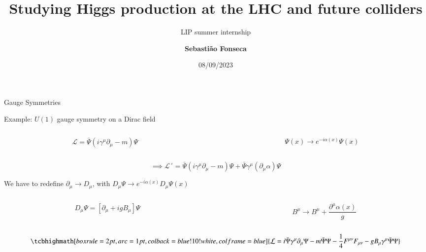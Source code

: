 \documentclass[10pt,t]{beamer}
\title{Studying Higgs production at the LHC and future colliders}
\subtitle{\small LIP summer internship}
\author{\textbf{Sebastião Fonseca}}
\institute{Project supervisor: João Pires }
\date{08/09/2023}
\begin{document}
\frame{\titlepage}


\begin{frame}{Gauge Symmetries}
    
    
    \pause
    \small
    \center Example: $U(1)$ gauge symmetry on a Dirac field
    \begin{columns}
    \begin{column}{0.5\textwidth}
       \begin{equation*}
        \mathcal{L} = \bar{\Psi}\left(i\gamma^{\mu}\partial_{\mu}-m\right)\Psi
       \end{equation*}      
    \end{column}
    \begin{column}{0.5\textwidth}
       \begin{equation*}
         \Psi(x)\rightarrow e^{-i\alpha(x)}\Psi(x)
       \end{equation*}    
    \end{column}
    \end{columns}
    
    \pause
    
    \begin{equation*}
       \implies \mathcal{L}´ = \bar{\Psi}\left(i\gamma^{\mu}\partial_{\mu}-m\right)\Psi+\bar{\Psi}\gamma^{\mu}\left(\partial_{\mu}\alpha\right)\Psi
    \end{equation*}
    \small
    
    \center We have to redefine $\partial_{\mu} \rightarrow D_{\mu} $, with $D_{\mu}\Psi \rightarrow e^{-i\alpha(x)}D_{\mu}\Psi(x)$
    \pause
    \begin{columns}
    \begin{column}{0.5\textwidth}
       \begin{equation*}
        D_{\mu}\Psi = \left[\partial_{\mu}+igB_{\mu} \right]\Psi
       \end{equation*}      
    \end{column}
    \begin{column}{0.5\textwidth}
       \begin{equation*}
         B^{\mu} \rightarrow B^{\mu} + \frac{\partial^{\mu}\alpha(x)}{g}
       \end{equation*}    
    \end{column}
    \end{columns}

    \pause

    \begin{equation*}
        \tcbhighmath[boxrule=2pt,arc=1pt,colback=blue!10!white,colframe=blue]{\mathcal{L} = i\bar{\Psi}\gamma^{\mu}\partial_{\mu}\Psi -m\bar{\Psi}\Psi-\frac{1}{4}F^{\mu\nu}F_{\mu\nu}-gB_{\mu}\gamma^{\mu}\bar{\Psi}\Psi}
    \end{equation*}


\end{frame}
\end{document}
